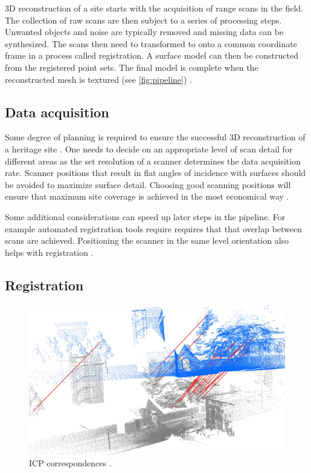 3D reconstruction of a site starts with the acquisition of range scans in the field. The collection of raw scans are then subject to a series of processing steps. Unwanted objects and noise are typically removed and missing data can be synthesized. The scans then need to transformed to onto a common coordinate frame in a process called registration. A surface model can then be constructed from the registered point sets. The final model is complete when the reconstructed mesh is textured (see \autoref{fig:pipeline}) \cite{Ruther2011}.

\subsection{Data acquisition}
Some degree of planning is required to ensure the successful 3D reconstruction of a heritage site \cite{Ruther2011}. One needs to decide on an appropriate level of scan detail for different areas as the set resolution of a scanner determines the data acquisition rate. Scanner positions that result in flat angles of incidence with surfaces should be avoided to maximize surface detail. Choosing good scanning positions will ensure that maximum site coverage is achieved in the most economical way \cite{Ruther2011}.

Some additional considerations can speed up later steps in the pipeline. For example automated registration tools require requires that that overlap between scans are achieved. Positioning the scanner in the same level orientation also helps with registration \cite{Ruther2011}.

\subsection{Registration}  \label{sec:registration}

\begin{figure}[ht]
  \centering
  \includegraphics[width=0.6\linewidth]{images/registration}
  \caption{ICP correspondences \protect\footnotemark.}
  \label{fig:registration}
\end{figure}

